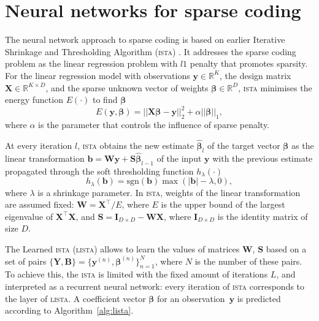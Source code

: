 \documentclass{article}
\begin{document}
\section{Neural networks for sparse coding}
\label{sec:nn_sc}
The neural network approach to sparse coding is based on earlier Iterative Shrinkage and Thresholding Algorithm (\textsc{ista}) \cite{daubechies2004iterative}. It addresses the sparse coding problem as the linear regression problem with $l1$ penalty that promotes sparsity. For the linear regression model with observations $\mathbf{y} \in \mathbb{R}^K$, the design matrix $\mathbf{X} \in \mathbb{R}^{K \times D}$, and the sparse unknown vector of weights $\boldsymbol\beta \in \mathbb{R}^D$, \textsc{ista} minimises the energy function $E(\cdot)$ to find $\boldsymbol\beta$
\begin{equation}
\label{eq:regression_problem}
E(\mathbf{y}, \boldsymbol\beta) = ||\mathbf{X}\boldsymbol\beta - \mathbf{y}||_2^2 + \alpha ||\boldsymbol\beta||_1,
\end{equation}
where $\alpha$ is the parameter that controls the influence of sparse penalty.

At every iteration $l$, \textsc{ista} obtains the new estimate $\widehat{\boldsymbol\beta}_l$ of the target vector $\boldsymbol\beta$ as the linear transformation $\mathbf{b} = \mathbf{W}\mathbf{y} + \mathbf{S}\widehat{\boldsymbol\beta}_{l-1}$ of the input $\mathbf{y}$ with the previous estimate propagated through the soft thresholding function $h_\lambda(\cdot)$
\begin{equation}
h_\lambda(\mathbf{b}) = \text{sgn}(\mathbf{b}) \max(|\mathbf{b}| - \lambda, 0),
\end{equation}
where $\lambda$ is a shrinkage parameter.
In \textsc{ista}, weights of the linear transformation are assumed fixed: $\mathbf{W} = \mathbf{X}^\top / E$, where $E$ is the upper bound of the largest eigenvalue of $\mathbf{X}^\top\mathbf{X}$, and $\mathbf{S} = \mathbf{I}_{D \times D} - \mathbf{W}\mathbf{X}$, where $\mathbf{I}_{D \times D}$ is the identity matrix of size $D$.

The Learned \textsc{ista} (\textsc{lista}) \cite{gregor2010learning} allows to learn the values of matrices $\mathbf{W}$, $\mathbf{S}$ based on a set of pairs $\{\mathbf{Y}, \mathbf{B}\}=\{\mathbf{y}^{(n)}, \boldsymbol\beta^{(n)}\}_{n=1}^N$, where $N$ is the number of these pairs. To achieve this, the \textsc{ista} is limited with the fixed amount of iterations $L$, and interpreted as a recurrent neural network: every iteration of \textsc{ista} corresponds to the layer of \textsc{lista}. A coefficient vector $\boldsymbol\beta$ for an observation~$\mathbf{y}$ is predicted according to Algorithm~\ref{alg:lista}.
\end{document}
